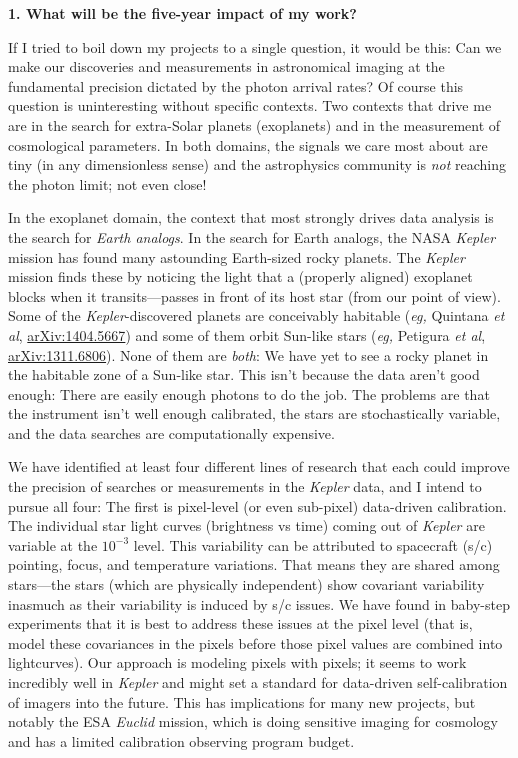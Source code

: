 \documentclass[11pt, letterpaper]{article}
\newcommand{\arxiv}[1]{\href{http://arxiv.org/abs/#1}{arXiv:#1}}
\begin{document}
\sloppy\sloppypar

\noindent\textbf{1. What will be the five-year impact of my work?}
\smallskip

If I tried to boil down my projects to a single question, it would be
this:
Can we make our discoveries and measurements in astronomical imaging
at the fundamental precision dictated by the photon arrival rates?
Of course this question is uninteresting without specific contexts.
Two contexts that drive me are in the search for extra-Solar planets
(exoplanets) and in the measurement of cosmological parameters.
In both domains, the signals we care most about are tiny (in any
dimensionless sense) and the astrophysics community is \emph{not}
reaching the photon limit; not even close!

In the exoplanet domain, the context that most strongly drives data
analysis is the search for \emph{Earth analogs}.
In the search for Earth analogs, the NASA \textsl{Kepler} mission has
found many astounding Earth-sized rocky planets.
The \textsl{Kepler} mission finds these by noticing the light that a
(properly aligned) exoplanet blocks when it transits---passes in front
of its host star (from our point of view).
Some of the \textsl{Kepler}-discovered planets are conceivably habitable
(\textit{eg,} Quintana \textit{et al}, \arxiv{1404.5667})
and some of them orbit Sun-like stars
(\textit{eg,} Petigura \textit{et al}, \arxiv{1311.6806}).
None of them are \emph{both}: We have yet to see a rocky planet in the
habitable zone of a Sun-like star.
This isn't because the data aren't good enough:
There are easily enough photons to do the job.
The problems are that the instrument isn't well enough calibrated, the
stars are stochastically variable, and the data searches are
computationally expensive.

We have identified at least four different lines of research that each
could improve the precision of searches or measurements in the
\textsl{Kepler} data, and I intend to pursue all four:
The first is pixel-level (or even sub-pixel) data-driven calibration.
The individual star light curves (brightness vs time) coming out of
\textsl{Kepler} are variable at the $10^{-3}$ level.
This variability can be attributed to spacecraft (s/c) pointing,
focus, and temperature variations.
That means they are shared among stars---the stars (which are
physically independent) show covariant variability inasmuch as their
variability is induced by s/c issues.
We have found in baby-step experiments that it is best to address
these issues at the pixel level (that is, model these covariances in
the pixels before those pixel values are combined into lightcurves).
Our approach is modeling pixels with pixels; it seems to work
incredibly well in \textsl{Kepler} and might set a standard for
data-driven self-calibration of imagers into the future.
This has implications for many new projects, but notably the ESA
\textsl{Euclid} mission, which is doing sensitive imaging for
cosmology and has a limited calibration observing program budget.
\end{document}
